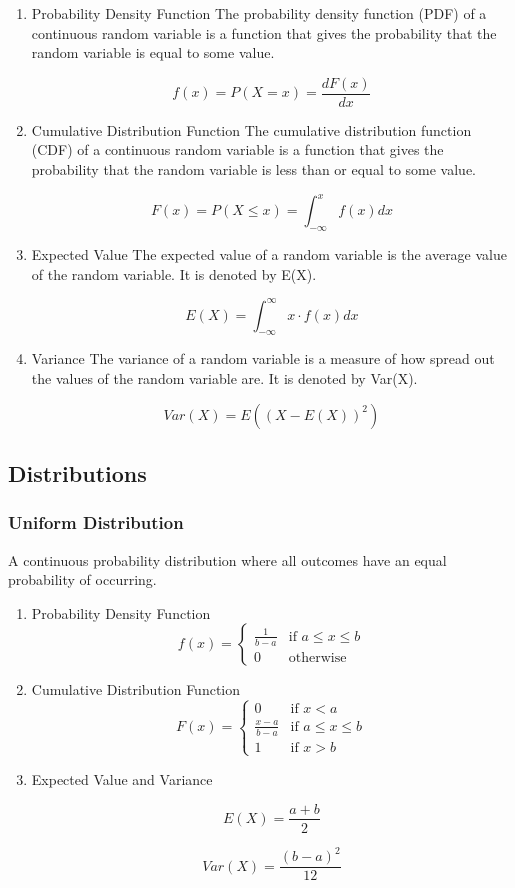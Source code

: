 \documentclass[11pt]{article}
\def\cheatsheetitemsep{-0.5em}
\let\olditem\item
\def\item{\vspace{\cheatsheetitemsep}\olditem}
\begin{document}
\begin{enumerate}
\item Probability Density Function
\label{sec:org764379f}
The probability density function (PDF) of a continuous random variable is a function that gives the probability that the random variable is equal to some value.

\[
f(x) = P(X=x) = \frac{dF(x)}{dx}
\]

\item Cumulative Distribution Function
\label{sec:org7baa156}
The cumulative distribution function (CDF) of a continuous random variable is a function that gives the probability that the random variable is less than or equal to some value.

\[
F(x) = P(X \leq x) = \int_{-\infty}^x f(x) dx
\]

\item Expected Value
\label{sec:org339f19c}
The expected value of a random variable is the average value of the random variable. It is denoted by E(X).

\[
E(X) = \int_{-\infty}^\infty x \cdot f(x) dx
\]

\item Variance
\label{sec:org757ae35}
The variance of a random variable is a measure of how spread out the values of the random variable are. It is denoted by Var(X).

\[
Var(X) = E((X - E(X))^2)
\]
\end{enumerate}

\subsection{Distributions}
\label{sec:org689fc40}
\subsubsection{Uniform Distribution}
\label{sec:org3dba0a5}
A continuous probability distribution where all outcomes have an equal probability of occurring.

\begin{enumerate}
\item Probability Density Function
\label{sec:orgaeddf7d}
\[
f(x) = \begin{cases}
\frac{1}{b-a} & \text{if } a \leq x \leq b \\
0 & \text{otherwise}
\end{cases}
\]

\item Cumulative Distribution Function
\label{sec:orgc0467cd}
\[
F(x) = \begin{cases}
0 & \text{if } x < a \\
\frac{x-a}{b-a} & \text{if } a \leq x \leq b \\
1 & \text{if } x > b
\end{cases}
\]

\item Expected Value and Variance
\label{sec:org1b06a5a}

\[
E(X) = \frac{a+b}{2}
\]

\[
Var(X) = \frac{(b-a)^2}{12}
\]
\end{enumerate}
\end{document}
